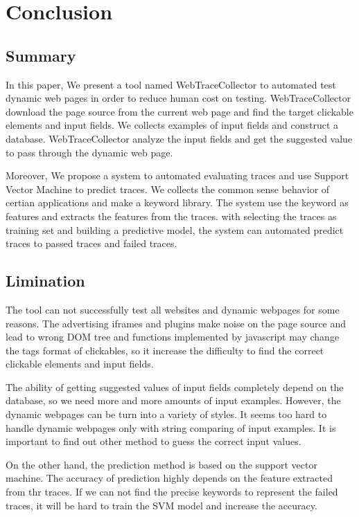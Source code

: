 
\chapter{Conclusion}\label{ch:conclusion}

\section{Summary}

In this paper, We present a tool named WebTraceCollector to automated test dynamic web pages in order to reduce human cost on testing.
WebTraceCollector download the page source from the current web page and find the target clickable elements and input fields.
We collects examples of input fields and construct a database.
WebTraceCollector analyze the input fields and get the suggested value to pass through the dynamic web page.

Moreover, We propose a system to automated evaluating traces and use Support Vector Machine to predict traces.
We collects the common sense behavior of certian applications and make a keyword library.
The system use the keyword as features and extracts the features from the traces.
with selecting the traces as training set and building a predictive model,
the system can automated predict traces to passed traces and failed traces.


\section{Limination}

The tool can not successfully test all websites and dynamic webpages for some reasons.
The advertising iframes and plugins make noise on the page source and lead to wrong DOM tree
and functions implemented by javascript may change the tags format of clickables,
so it increase the difficulty to find the correct clickable elements and input fields.

The ability of getting suggested values of input fields completely depend on the database,
so we need more and more amounts of input examples.
However, the dynamic webpages can be turn into a variety of styles.
It seems too hard to handle dynamic webpages only with string comparing of input examples.
It is important to find out other method to guess the correct input values.

On the other hand, the prediction method is based on the support vector machine.
The accuracy of prediction highly depends on the feature extracted from thr traces.
If we can not find the precise keywords to represent the failed traces,
it will be hard to train the SVM model and increase the accuracy.

